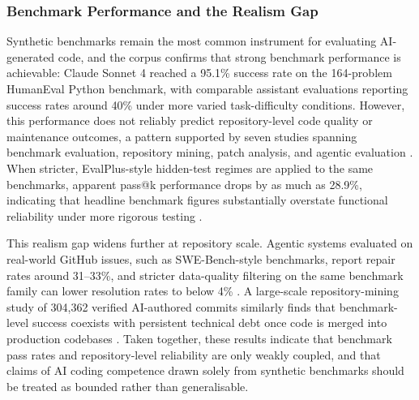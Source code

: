 \subsubsection{Benchmark Performance and the Realism Gap}
\label{sec:cqtd-benchmark}
Synthetic benchmarks remain the most common instrument for evaluating AI-generated code, and the corpus confirms that strong benchmark performance is achievable: Claude Sonnet 4 reached a 95.1\% success rate on the 164-problem HumanEval Python benchmark, with comparable assistant evaluations reporting success rates around 40\% under more varied task-difficulty conditions. However, this performance does not reliably predict repository-level code quality or maintenance outcomes, a pattern supported by seven studies spanning benchmark evaluation, repository mining, patch analysis, and agentic evaluation \cite{idrisov_program_2024,bayram_comparative_2025,chen_evaluating_2024,aleithan_swe-bench_2024,abbassi_recatcher_2025,zheng_top_2025,dou_whats_2026}. When stricter, EvalPlus-style hidden-test regimes are applied to the same benchmarks, apparent pass@k performance drops by as much as 28.9\%, indicating that headline benchmark figures substantially overstate functional reliability under more rigorous testing \cite{liu_is_2023}.

This realism gap widens further at repository scale. Agentic systems evaluated on real-world GitHub issues, such as SWE-Bench-style benchmarks, report repair rates around 31--33\%, and stricter data-quality filtering on the same benchmark family can lower resolution rates to below 4\% \cite{aleithan_swe-bench_2024,chen_evaluating_2024}. A large-scale repository-mining study of 304,362 verified AI-authored commits similarly finds that benchmark-level success coexists with persistent technical debt once code is merged into production codebases \cite{liu_debt_2026}. Taken together, these results indicate that benchmark pass rates and repository-level reliability are only weakly coupled, and that claims of AI coding competence drawn solely from synthetic benchmarks should be treated as bounded rather than generalisable.


